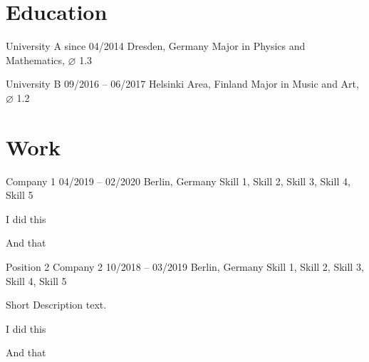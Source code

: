 \header*


\section*{Education}

  {University A}
  {since 04/2014}
  {Dresden, Germany}
  {Major in Physics and Mathematics, $\varnothing$ 1.3}
  {}

  {University B}
  {09/2016 -- 06/2017}
  {Helsinki Area, Finland}
  {Major in Music and Art, $\varnothing$ 1.2}
  {}

\section*{Work}

  {Company 1}
  {04/2019 -- 02/2020}
  {Berlin, Germany}
  {%
    Skill 1,
    Skill 2,
    Skill 3,
    Skill 4,
    Skill 5
  }
  {%
    \begin{cvitems}
      \item {I did this}
      \item {And that}
    \end{cvitems}
  }
\cvEntry
  {Position 2}
  {Company 2}
  {10/2018 -- 03/2019}
  {Berlin, Germany}
  {%
    Skill 1,
    Skill 2,
    Skill 3,
    Skill 4,
    Skill 5
  }
  {%
    Short Description text.
    \begin{cvitems}
      \item {I did this}
      \item {And that}
    \end{cvitems}
  }

